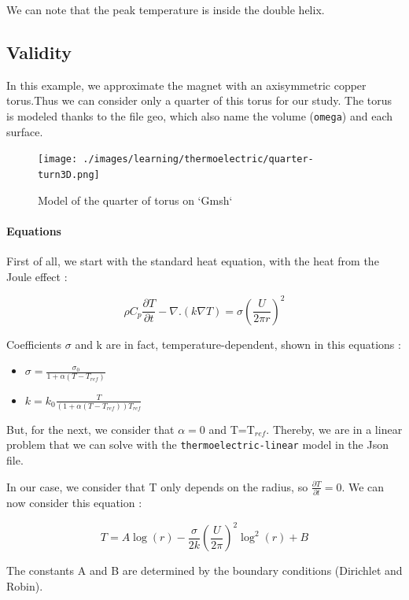 \documentclass[11pt]{amsart}
\begin{document}
We can note that the peak temperature is inside the double helix.


\hypertarget{x-validity}{\subsection{Validity}}
In this example, we approximate the magnet with an axisymmetric copper torus.Thus we can consider only a quarter of this torus for our study.
The torus is modeled thanks to the file geo, which also name the volume (\texttt{omega}) and each surface.


\begin{figure}[h]{}
\centering\texttt{[image: ./images/learning/thermoelectric/quarter-turn3D.png]}
\caption{Model of the quarter of torus on `Gmsh`}
\centering
\end{figure}

\hypertarget{x-equations}{\paragraph{Equations}}
First of all, we start with the standard heat equation, with the heat from the Joule effect :

\[
\rho C_{p}\frac{\partial T}{\partial t} - \nabla.(k \nabla T)=\sigma(\frac{U}{2\pi r})^{2}
\]



Coefficients $\sigma$ and k are in fact, temperature-dependent, shown in this equations :


\begin{itemize}

\item $\sigma=\frac{\sigma_ {0}}{1 + \alpha(T-T_{ref})}$

\item $k=k_{0}\frac{T}{(1+\alpha(T-T_{ref}))T_{ref}}$

\end{itemize}


But, for the next, we consider that $\alpha=0$ and T=T${}_{ref}$.
Thereby, we are in a linear problem that we can solve with the \texttt{thermoelectric-linear} model in the Json file.


In our case, we consider that T only depends on the radius, so $\frac{\partial T}{\partial t}=0$.
We can now consider this equation :

\[
T=A\log(r)-\frac{\sigma}{2k}(\frac{U}{2\pi})^{2} \log^{2}(r)+B
\]



The constants A and B are determined by the boundary conditions (Dirichlet and Robin).
\end{document}
